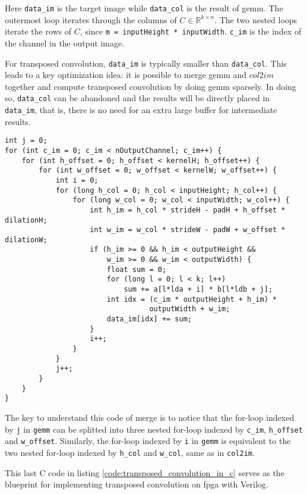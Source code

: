 Here \texttt{data_im} is the target image while \texttt{data_col} is the result of \gls{gemm}.
The outermost loop iterates through the columns of $C \in \mathbb{R}^{k \times n}$. The two nested loops
iterate the rows of $C$, since \texttt{m = inputHeight * inputWidth}. \texttt{c_im} is the
index of the channel in the output image. %

For transposed convolution, \texttt{data_im} is typically smaller than
\texttt{data_col}. This leads to a key optimization idea: it is possible to merge \gls{gemm} and
$col2im$ together and compute transposed convolution by doing \gls{gemm} sparsely. In doing so,
\texttt{data_col} can be abandoned and the results will be directly placed in \texttt{data_im},
that is, there is no need for an extra large buffer for intermediate results.

\begin{code}
\begin{verbatim}
int j = 0;
for (int c_im = 0; c_im < nOutputChannel; c_im++) {
    for (int h_offset = 0; h_offset < kernelH; h_offset++) {
        for (int w_offset = 0; w_offset < kernelW; w_offset++) {
            int i = 0;
            for (long h_col = 0; h_col < inputHeight; h_col++) {
                for (long w_col = 0; w_col < inputWidth; w_col++) {
                    int h_im = h_col * strideH - padH + h_offset * dilationH;
                    int w_im = w_col * strideW - padW + w_offset * dilationW;
                    if (h_im >= 0 && h_im < outputHeight &&
                        w_im >= 0 && w_im < outputWidth) {
                        float sum = 0;
                        for (long l = 0; l < k; l++)
                            sum += a[l*lda + i] * b[l*ldb + j];
                        int idx = (c_im * outputHeight + h_im) *
                                  outputWidth + w_im;
                        data_im[idx] += sum;
                    }
                    i++;
                }
            }
            j++;
        }
    }
}
\end{verbatim}
\label{code:transposed_convolution_in_c}
\end{code}

The key to understand this code of merge is to notice that the for-loop indexed by \texttt{j} in
\texttt{gemm} can be splitted into three nested for-loop indexed by \texttt{c_im},
\texttt{h_offset} and \texttt{w_offset}.
Similarly, the for-loop indexed by \texttt{i} in \texttt{gemm} is equivalent to the two
nested for-loop indexed by \texttt{h_col} and \texttt{w_col}, same as in \texttt{col2im}.

This last C code in listing \ref{code:transposed_convolution_in_c} serves as the blueprint for implementing
transposed convolution on \gls{fpga} with Verilog.

\clearpage %
